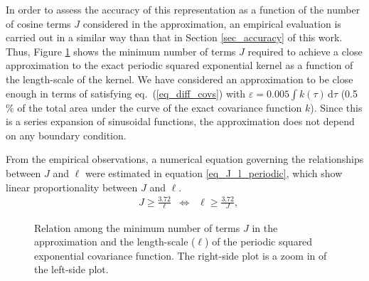 In order to assess the accuracy of this representation as a function of the number of cosine terms $J$ considered in the approximation, an empirical evaluation is carried out in a similar way than that in Section \ref{sec_accuracy} of this work. Thus, Figure \ref{figB1_m_lscale_periodic} shows the minimum number of terms $J$ required to achieve a close approximation to the exact periodic squared exponential kernel as a function of the length-scale of the kernel. We have considered an approximation to be close enough in terms of satisfying eq.~(\ref{eq_diff_covs}) with $\varepsilon=0.005 \int k(\tau) \,\mathrm{d}\tau$ (0.5$\%$ of the total area under the curve of the exact covariance function $k$). Since this is a series expansion of sinusoidal functions, the approximation does not depend on any boundary condition.

From the empirical observations, a numerical equation governing the relationships between $J$ and $\ell$ were estimated in equation \ref{eq_J_l_periodic}, which show linear proportionality between $J$ and $\ell$.
%
\begin{align}\label{eq_J_l_periodic}
&J \geq \frac{3.72}{\ell} \;\; \Leftrightarrow \;\; \ell \geq \frac{3.72}{J},
\end{align}

\begin{figure}
\centering
{}
\hspace{3mm}
\caption{Relation among the minimum number of terms $J$ in the approximation and the length-scale ($\ell$) of the periodic squared exponential covariance function. The right-side plot is a zoom in of the left-side plot.}
  \label{figB1_m_lscale_periodic}
\end{figure}



